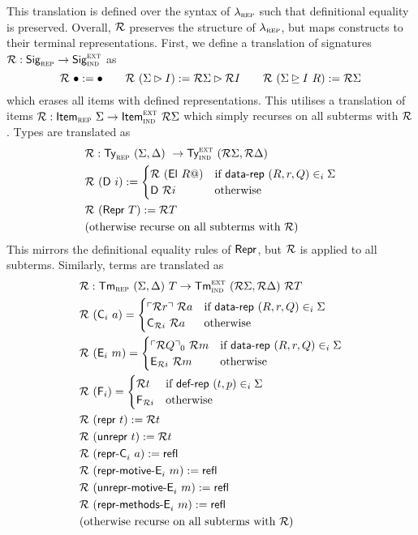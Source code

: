 This translation is defined over the syntax of $\lambda_{\textsc{rep}}$
\cite{Boulier2017-cm} such that definitional equality is preserved. Overall,
$\mathcal{R}$ preserves the structure of $\lambda_{\textsc{rep}}$, but maps constructs to
their terminal representations.
First, we define a translation of signatures $\mathcal{R} : \textsf{Sig}_{\textsc{rep}} \to \textsf{Sig}_{\textsc{ind}}^\textsc{ext}$ as
\[
\R\ \bullet := \bullet \qquad \R\ (\Sigma \rhd I) := \R \Sigma \rhd \R I \qquad \R\ (\Sigma \unrhd I \ R) := \R \Sigma
\]
which erases all items with defined representations.
This utilises a translation of items $\R : \Item_\rep\ \Sigma \to \Item_\ind^\lang{ext}\ \R
\Sigma$ which simply recurses on all subterms with $\mathcal{R}$.
Types are translated as
\begin{align*}
  & \mathcal{R} : \textsf{Ty}_{\textsc{rep}}\ (\Sigma, \Delta)\ \to \textsf{Ty}_{\textsc{ind}}^\textsc{ext}\ (\mathcal{R} \Sigma, \mathcal{R} \Delta) \\
  & \mathcal{R}\ (\textsf{D}\ i) := \begin{cases}
  \mathcal{R}\ (\textsf{El}\ R@) & \text{if $\textsf{data-rep}\ (R, r, Q) \in_i \Sigma$} \\
  \textsf{D}\ \mathcal{R} i & \text{otherwise}
  \end{cases} \\
  & \mathcal{R}\ (\textsf{Repr}\ T) := \mathcal{R} T \\
  & \text{(otherwise recurse on all subterms with $\mathcal{R}$)}
\end{align*}
This mirrors the definitional equality rules of $\textsf{Repr}$, but $\mathcal{R}$ is applied
to all subterms.
Similarly, terms are translated as
\begin{align*}
  & \mathcal{R} : \textsf{Tm}_{\textsc{rep}}\ (\Sigma, \Delta)\ T \to \textsf{Tm}_{\textsc{ind}}^\textsc{ext}\ (\mathcal{R} \Sigma, \mathcal{R} \Delta)\ \mathcal{R} T \\
  &\mathcal{R}\ (\textsf{C}_i\ a) = \begin{cases}
      \ulcorner \mathcal{R} r \urcorner\ \mathcal{R} a & \text{if}\ \textsf{data-rep}\ (R, r, Q) \in_i \Sigma \\
      \textsf{C}_{\mathcal{R} i}\ \mathcal{R} a & \text{otherwise}
  \end{cases} \\
  &\mathcal{R}\ (\textsf{E}_i\ m) = \begin{cases}
      \ulcorner \mathcal{R} Q \urcorner_0\ \mathcal{R} m & \text{if}\ \textsf{data-rep}\ (R, r, Q) \in_i \Sigma \\
      \textsf{E}_{\mathcal{R} i}\ \mathcal{R} m & \text{otherwise}
  \end{cases} \\
  &\mathcal{R}\ (\textsf{F}_i) = \begin{cases}
        \mathcal{R} t & \text{if}\ \textsf{def-rep}\ (t, p) \in_i \Sigma \\
        \textsf{F}_{\mathcal{R} i} & \text{otherwise}
    \end{cases} \\
  & \mathcal{R}\ (\textsf{repr}\ t) := \mathcal{R} t \\
  & \mathcal{R}\ (\textsf{unrepr}\ t) := \mathcal{R} t \\
  & \mathcal{R}\ (\textsf{repr-C}_i\ a) := \textsf{refl} \\
  & \mathcal{R}\ (\textsf{repr-motive-E}_i\ m) := \textsf{refl} \\
  & \mathcal{R}\ (\textsf{unrepr-motive-E}_i\ m) := \textsf{refl} \\
  & \mathcal{R}\ (\textsf{repr-methods-E}_i\ m) := \textsf{refl} \\
  & \text{(otherwise recurse on all subterms with $\mathcal{R}$)}
\end{align*}
